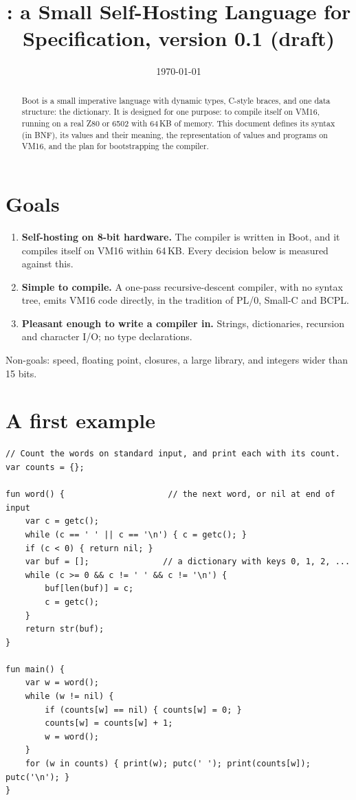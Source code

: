 \documentclass[11pt,a4paper]{article}
\title{\lang: a Small Self-Hosting Language for \vm{}\\[4pt]
\large Specification, version 0.1 (draft)}
\author{}
\date{\today}
\newcommand{\lang}{Boot}
\newcommand{\vm}{VM16}
\begin{document}
\maketitle

\begin{abstract}
\noindent
\lang{} is a small imperative language with dynamic types, C-style braces,
and one data structure: the dictionary. It is designed for one purpose: to
compile itself on \vm{}, running on a real Z80 or 6502 with 64\,KB of
memory. This document defines its syntax (in BNF), its values and their
meaning, the representation of values and programs on \vm{}, and the plan for
bootstrapping the compiler.
\end{abstract}

\section{Goals}

\begin{enumerate}[nosep]
\item \textbf{Self-hosting on 8-bit hardware.} The compiler is written in
  \lang{}, and it compiles itself on \vm{} within 64\,KB. Every decision
  below is measured against this.
\item \textbf{Simple to compile.} A one-pass recursive-descent compiler,
  with no syntax tree, emits \vm{} code directly, in the tradition of PL/0,
  Small-C and BCPL.
\item \textbf{Pleasant enough to write a compiler in.} Strings, dictionaries,
  recursion and character I/O; no type declarations.
\end{enumerate}
Non-goals: speed, floating point, closures, a large library, and integers
wider than 15 bits.

\section{A first example}

\begin{lstlisting}
// Count the words on standard input, and print each with its count.
var counts = {};

fun word() {                     // the next word, or nil at end of input
    var c = getc();
    while (c == ' ' || c == '\n') { c = getc(); }
    if (c < 0) { return nil; }
    var buf = [];               // a dictionary with keys 0, 1, 2, ...
    while (c >= 0 && c != ' ' && c != '\n') {
        buf[len(buf)] = c;
        c = getc();
    }
    return str(buf);
}

fun main() {
    var w = word();
    while (w != nil) {
        if (counts[w] == nil) { counts[w] = 0; }
        counts[w] = counts[w] + 1;
        w = word();
    }
    for (w in counts) { print(w); putc(' '); print(counts[w]); putc('\n'); }
}
\end{lstlisting}
\end{document}
